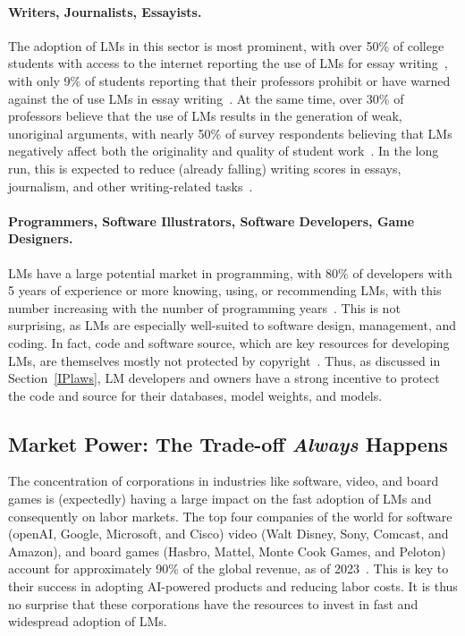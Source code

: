 {{{{\paragraph{Writers, Journalists, Essayists.}
The adoption of LMs in this sector is most prominent, with over 50\% of college students with access to the internet reporting the use of LMs for essay writing~\citep{harvard2025chatgpt}, with only 9\% of students reporting that their professors prohibit or have warned against the of use LMs in essay writing~\citep{si2024can}.
At the same time, over 30\% of professors believe that the use of LMs results in the generation of weak, unoriginal arguments, with nearly 50\% of survey respondents believing that LMs negatively affect both the originality and quality of student work~\citep{porter2024ai}.
In the long run, this is expected to reduce (already falling) writing scores in essays, journalism, and other writing-related tasks~\citep{moon2024homogenizing}.
\paragraph{Programmers, Software Illustrators, Software Developers, Game Designers.}
LMs have a large potential market in programming, with 80\% of developers with 5 years of experience or more knowing, using, or recommending LMs, with this number increasing with the number of programming years~\citep{peng2023impact}.
This is not surprising, as LMs are especially well-suited to software design, management, and coding.
In fact, code and software source, which are key resources for developing LMs, are themselves mostly not protected by copyright~\citep{henderson2023foundation}.
Thus, as discussed in Section~\ref{IPlaws}, LM developers and owners have a strong incentive to protect the code and source for their databases, model weights, and models.

\subsection{Market Power: The Trade-off \emph{Always} Happens}

The concentration of corporations in industries like software, video, and board games is (expectedly) having a large impact on the fast adoption of LMs and consequently on labor markets.
The top four companies of the world for software (openAI, Google, Microsoft, and Cisco) video (Walt Disney, Sony, Comcast, and Amazon), and board games (Hasbro, Mattel, Monte Cook Games, and Peloton) account for approximately 90\% of the global revenue, as of 2023~\citep{palmerI}.
This is key to their success in adopting AI-powered products and reducing labor costs.
It is thus no surprise that these corporations have the resources to invest in fast and widespread adoption of LMs.

}}}}
